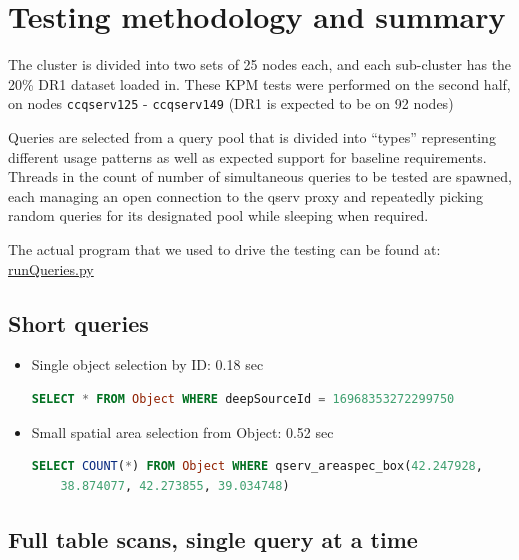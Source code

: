 \documentclass[DM,toc]{lsstdoc}
\begin{document}
\section{Testing methodology and
summary}\label{testing-methodology-and-summary}

The cluster is divided into two sets of 25 nodes each, and each
sub-cluster has the 20\% DR1 dataset loaded in. These KPM tests were
performed on the second half, on nodes \texttt{ccqserv125} - \texttt{ccqserv149} (DR1 is
expected to be on 92 nodes)

Queries are selected from a query pool that is divided into ``types''
representing different usage patterns as well as expected support for
baseline requirements. Threads in the count of number of simultaneous
queries to be tested are spawned, each managing an open connection to
the qserv proxy and repeatedly picking random queries for its designated
pool while sleeping when required.

The actual program that we used to drive the testing can be found
at: \href{https://github.com/lsst/qserv/blob/master/admin/tools/docker/deployment/in2p3/runQueries.py}{runQueries.py}

\subsection{Short queries}\label{short-queries}

\begin{itemize}
\item Single object selection by ID: 0.18 sec

\begin{lstlisting}[language=SQL]
SELECT * FROM Object WHERE deepSourceId = 16968353272299750
\end{lstlisting}


\item Small spatial area selection from Object: 0.52 sec

\begin{lstlisting}[language=SQL]
SELECT COUNT(*) FROM Object WHERE qserv_areaspec_box(42.247928,
    38.874077, 42.273855, 39.034748)
\end{lstlisting}

\end{itemize}

\subsection{Full table scans, single query at
a
time}\label{full-table-scans-single-query-at-a-time}
\end{document}
